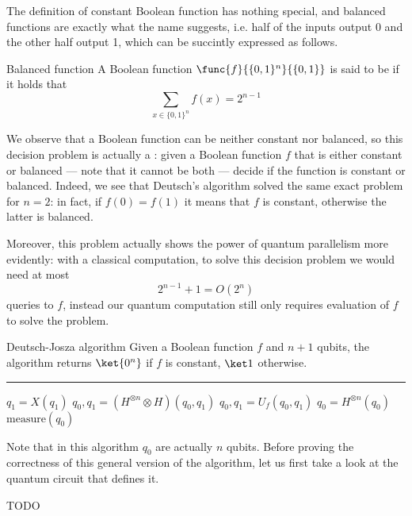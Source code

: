 \documentclass[a4paper, 12pt]{report}
\begin{document}
The definition of constant Boolean function has nothing special, and balanced functions are exactly what the name suggests, i.e. half of the inputs output 0 and the other half output 1, which can be succintly expressed as follows.

\begin{frameddefn}{Balanced function}
    A Boolean function $\func{f}{\{0, 1\}^n}{\{0,1\}}$ is said to be  if it holds that $$\sum_{x \in \{0, 1\}^n}{f(x)} = 2^{n - 1}$$
\end{frameddefn}

We observe that a Boolean function can be neither constant nor balanced, so this decision problem is actually a : given a Boolean function $f$ that is either constant or balanced --- note that it cannot be both --- decide if the function is constant or balanced. Indeed, we see that Deutsch's algorithm solved the same exact problem for $n = 2$: in fact, if $f(0) = f(1)$ it means that $f$ is constant, otherwise the latter is balanced.

Moreover, this problem actually shows the power of quantum parallelism more evidently: with a classical computation, to solve this decision problem we would need at most $$2^{n - 1} + 1 = O(2^n)$$ queries to $f$, instead our quantum computation still only requires  evaluation of $f$ to solve the problem.

\begin{framedalgo}{Deutsch-Josza algorithm}
    Given a Boolean function $f$ and $n + 1$ qubits, the algorithm returns $\ket{0^n}$ if $f$ is constant, $\ket 1$ otherwise. \\
    \hrule

    \quad
    \begin{algorithmic}[1]
            \State $q_1 = X(q_1)$
            \State $q_0, q_1 = (H^{\otimes n} \otimes H)(q_0, q_1)$
            \State $q_0, q_1 = U_f(q_0, q_1)$
            \State $q_0 = H^{\otimes n}(q_0)$
            \State {} $\mbox{measure}(q_0)$
        \EndFunction
    \end{algorithmic}
\end{framedalgo}

Note that in this algorithm $q_0$ are actually $n$ qubits. Before proving the correctness of this general version of the algorithm, let us first take a look at the quantum circuit that defines it.

TODO 
\end{document}
